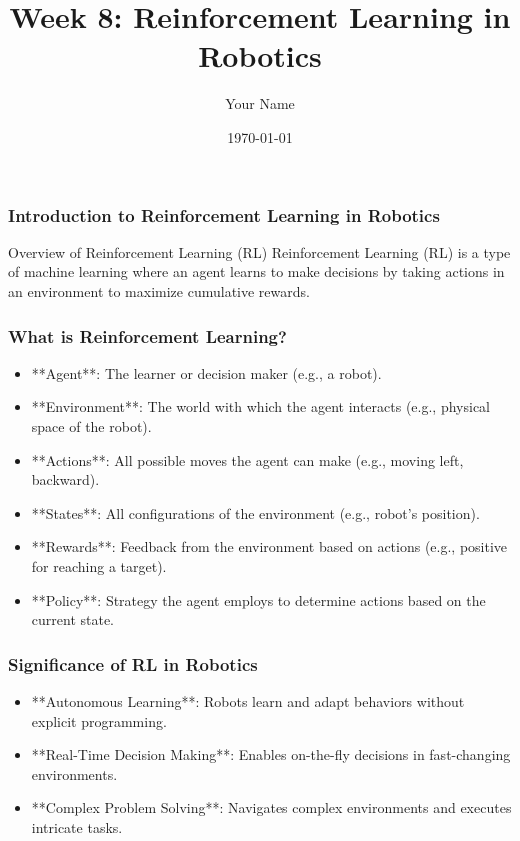 \documentclass{beamer}
\title{Week 8: Reinforcement Learning in Robotics}
\author{Your Name}
\institute{Your Institution}
\date{\today}
\begin{document}
\frame{\titlepage}

\begin{frame}[fragile]
    \frametitle{Introduction to Reinforcement Learning in Robotics}
    \begin{block}{Overview of Reinforcement Learning (RL)}
        Reinforcement Learning (RL) is a type of machine learning where an agent learns to make decisions by taking actions in an environment to maximize cumulative rewards.
    \end{block}
\end{frame}

\begin{frame}[fragile]
    \frametitle{What is Reinforcement Learning?}
    \begin{itemize}
        \item **Agent**: The learner or decision maker (e.g., a robot).
        \item **Environment**: The world with which the agent interacts (e.g., physical space of the robot).
        \item **Actions**: All possible moves the agent can make (e.g., moving left, backward).
        \item **States**: All configurations of the environment (e.g., robot's position).
        \item **Rewards**: Feedback from the environment based on actions (e.g., positive for reaching a target).
        \item **Policy**: Strategy the agent employs to determine actions based on the current state.
    \end{itemize}
\end{frame}

\begin{frame}[fragile]
    \frametitle{Significance of RL in Robotics}
    \begin{itemize}
        \item **Autonomous Learning**: Robots learn and adapt behaviors without explicit programming.
        \item **Real-Time Decision Making**: Enables on-the-fly decisions in fast-changing environments.
        \item **Complex Problem Solving**: Navigates complex environments and executes intricate tasks.
    \end{itemize}
\end{frame}
\end{document}
